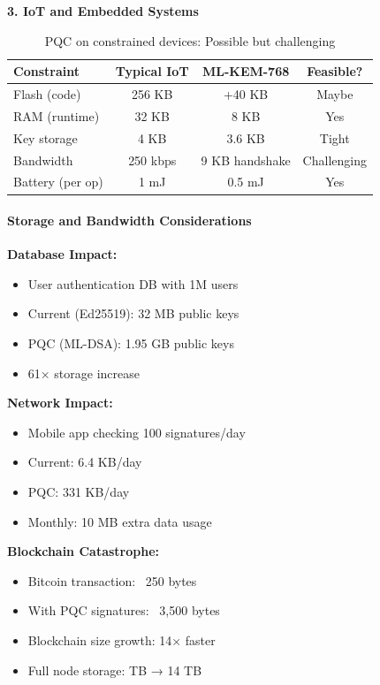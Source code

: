 \documentclass[11pt,a4paper]{article}
\begin{document}
\textbf{3. IoT and Embedded Systems}

\begin{table}[h]
\centering
\begin{tabular}{|l|c|c|c|}
\hline
\textbf{Constraint} & \textbf{Typical IoT} & \textbf{ML-KEM-768} & \textbf{Feasible?} \\
\hline
Flash (code) & 256 KB & +40 KB & Maybe \\
RAM (runtime) & 32 KB & 8 KB & Yes \\
Key storage & 4 KB & 3.6 KB & Tight \\
Bandwidth & 250 kbps & 9 KB handshake & Challenging \\
Battery (per op) & 1 mJ & 0.5 mJ & Yes \\
\hline
\end{tabular}
\caption{PQC on constrained devices: Possible but challenging}
\end{table}

\paragraph{Storage and Bandwidth Considerations}

\textbf{Database Impact:}
\begin{itemize}
    \item User authentication DB with 1M users
    \item Current (Ed25519): 32 MB public keys
    \item PQC (ML-DSA): 1.95 GB public keys
    \item 61× storage increase
\end{itemize}

\textbf{Network Impact:}
\begin{itemize}
    \item Mobile app checking 100 signatures/day
    \item Current: 6.4 KB/day
    \item PQC: 331 KB/day
    \item Monthly: 10 MB extra data usage
\end{itemize}

\textbf{Blockchain Catastrophe:}
\begin{itemize}
    \item Bitcoin transaction: ~250 bytes
    \item With PQC signatures: ~3,500 bytes
    \item Blockchain size growth: 14× faster
    \item Full node storage: TB → 14 TB
\end{itemize}
\end{document}
